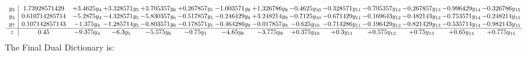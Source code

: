 \documentclass[11pt]{article}
\begin{document}
\[\begin{array}{c| c c@{\hskip 2pt} c@{\hskip 2pt} c@{\hskip 2pt} c@{\hskip 2pt} c@{\hskip 2pt} c@{\hskip 2pt} c@{\hskip 2pt} c@{\hskip 2pt} c@{\hskip 2pt} c@{\hskip 2pt} c@{\hskip 2pt} c@{\hskip 2pt} }
 y_{2}   &  1.73928571429 & + 3.4625 y_{4} & + 3.328571 y_{5} & + 3.705357 y_{6} & + 0.267857 y_{1} & -1.003571 y_{8} & + 1.326786 y_{9} & -0.4625 y_{10} & -0.328571 y_{11} & -0.705357 y_{12} & -0.267857 y_{13} & -0.996429 y_{14} & -0.326786 y_{15}\\
 y_{3}   &  0.610714285714 & -5.2875 y_{4} & -4.328571 y_{5} & -5.830357 y_{6} & -0.517857 y_{1} & -0.246429 y_{8} & + 3.248214 y_{9} & -0.7125 y_{10} & -0.671429 y_{11} & -0.169643 y_{12} & -0.482143 y_{13} & -0.753571 y_{14} & -0.248214 y_{15}\\
 y_{7}   &  0.107142857143 & -1.375 y_{4} & -1.285714 y_{5} & -0.803571 y_{6} & -0.178571 y_{1} & -0.464286 y_{8} & -0.017857 y_{9} & -0.625 y_{10} & -0.714286 y_{11} & -0.196429 y_{12} & -0.821429 y_{13} & -0.535714 y_{14} & -0.982143 y_{15}\\
\hline
z    &  0.45 & -9.375 y_{4} & -6.3 y_{5} & -5.575 y_{6} & -0.75 y_{1} & -4.65 y_{8} & -3.775 y_{9} & + 0.375 y_{10} & + 0.3 y_{11} & + 0.575 y_{12} & + 0.75 y_{13} & + 0.65 y_{14} & + 0.775 y_{15}\\
\end{array}\]
The Final Dual Dictionary is: 
\end{document}
